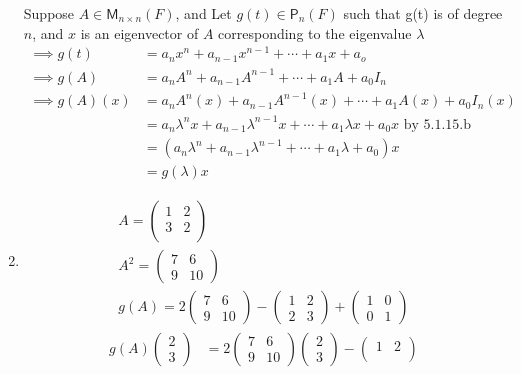 \begin{enumerate}
Suppose $A \in \mathsf{M}_{n\times n}(F)$, and Let $g(t) \in
\mathsf{P}_n(F)$ such that g(t) is of degree $n$, and $x$ is an
eigenvector of $A$ corresponding to the eigenvalue $\lambda$
\begin{align}
\implies g(t) &= a_nx^n +a_{n-1}x^{n-1} +\dotsb+ a_1x + a_o\\
\implies g(A) &= a_nA^n + a_{n-1}A^{n-1}
+\dotsb + a_1A +a_0I_n\\
\implies g(A) (x)&= a_nA^n(x) + a_{n-1}A^{n-1}(x)
+\dotsb + a_1A(x) +a_0I_n(x)\\
&=a_n\lambda^nx +a_{n-1}\lambda^{n-1}x +\dotsb +a_1\lambda x+
a_0x\text{ by 5.1.15.b}\\
&=(a_n\lambda^n +a_{n-1}\lambda^{n-1} +\dotsb +a_1\lambda + a_0)x\\
&=g(\lambda)x
\end{align}
\item 
\begin{gather}
A  = \begin{pmatrix}
1 & 2\\
3 & 2\\
\end{pmatrix}\\
A^2 =\begin{pmatrix}
7 & 6\\
9 & 10
\end{pmatrix}\\
g(A) = 2\begin{pmatrix}
7 & 6 \\
9 & 10
\end{pmatrix}
-\begin{pmatrix}
1 & 2 \\
2 & 3
\end{pmatrix}
+
\begin{pmatrix}
1 & 0\\
0 & 1
\end{pmatrix}
\end{gather}
\begin{align}
g(A)\begin{pmatrix}2\\3\end{pmatrix} &= 2\begin{pmatrix}
7 & 6 \\
9 & 10
\end{pmatrix}\begin{pmatrix}2\\3\end{pmatrix}
-\begin{pmatrix}
1 & 2 \\

\end{pmatrix}
\end{align}
\end{enumerate}
